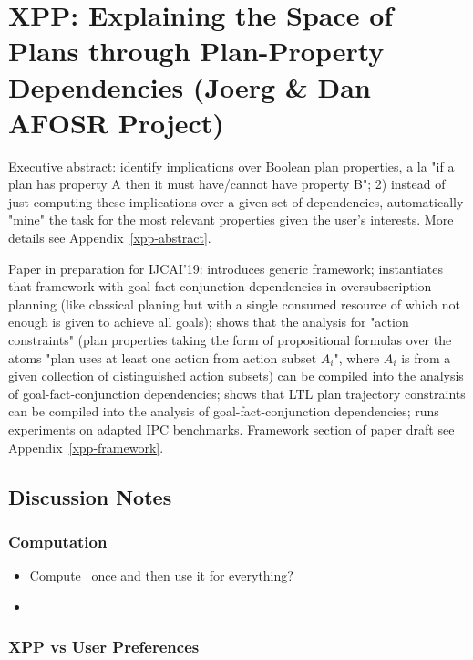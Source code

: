\section{XPP: Explaining the Space of Plans through Plan-Property Dependencies (Joerg \& Dan AFOSR Project)}
\label{xpp}

Executive abstract: identify implications over Boolean plan
properties, a la "if a plan has property A then it must have/cannot
have property B"; 2) instead of just computing these implications over
a given set of dependencies, automatically "mine" the task for the
most relevant properties given the user's interests. More details see
Appendix~\ref{xpp-abstract}.

Paper in preparation for IJCAI'19: introduces generic framework;
instantiates that framework with goal-fact-conjunction dependencies in
oversubscription planning (like classical planing but with a single
consumed resource of which not enough is given to achieve all goals);
shows that the analysis for "action constraints" (plan properties
taking the form of propositional formulas over the atoms "plan uses at
least one action from action subset $A_i$", where $A_i$ is from a
given collection of distinguished action subsets) can be compiled into
the analysis of goal-fact-conjunction dependencies; shows that LTL
plan trajectory constraints can be compiled into the analysis of
goal-fact-conjunction dependencies; runs experiments on adapted IPC
benchmarks. Framework section of paper draft see
Appendix~\ref{xpp-framework}.



\subsection{Discussion Notes}
\label{discussion}

\subsubsection{Computation}

\begin{itemize}
\item Compute \plans\ once and then use it for everything?

\item {}

\end{itemize}


\subsubsection{XPP vs User Preferences}

